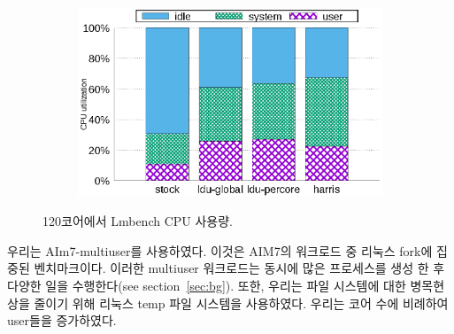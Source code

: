 \begin{figure}[tb]
    \centering
    \begin{subfigure}[b]{1\textwidth}
  \begin{center}
        \includegraphics[scale=0.8]{graph/lmbench_cpuutils.eps}
  \end{center}
    \end{subfigure}
        \centering
    \caption{120코어에서 Lmbench CPU 사용량.}
    \label{fig:utilization_lmbench}
    
\end{figure}




우리는 AIm7-multiuser를 사용하였다. 이것은 AIM7의 워크로드 중 리눅스 fork에 집중된 벤치마크이다. 
이러한 multiuser 워크로드는 동시에 많은 프로세스를 생성 한 후 다양한
 일을 수행한다(see section~\ref{sec:bg}).
 또한, 우리는 파일 시스템에 대한 병목현상을 줄이기 위해 리눅스 temp 파일 시스템을 사용하였다. 
우리는 코어 수에 비례하여 user들을 증가하였다. 
 
